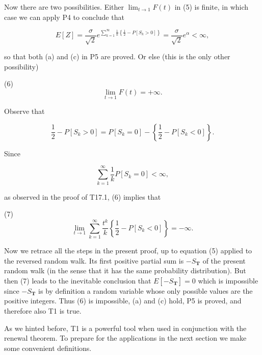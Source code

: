 Now there are two possibilities. Either $\lim_{t \to 1} F(t)$ in (5) is finite, in which case we can apply P4 to conclude that

$$E[Z] = \frac{\sigma}{\sqrt{2}} e^{\sum_{k=1}^{\infty} \frac{1}{k} \left\{ \frac{1}{2} - P[S_k > 0] \right\}} = \frac{\sigma}{\sqrt{2}} e^\alpha < \infty,$$

so that both (a) and (c) in P5 are proved. Or else (this is the only other possibility)

(6) $$\lim_{t \to 1} F(t) = +\infty.$$

Observe that

$$\frac{1}{2} - P[S_k > 0] = P[S_k = 0] - \left\{ \frac{1}{2} - P[S_k < 0] \right\}.$$

Since

$$\sum_{k=1}^{\infty} \frac{1}{k} P[S_k = 0] < \infty,$$

as observed in the proof of T17.1, (6) implies that

(7) $$\lim_{t \to 1} \sum_{k=1}^{\infty} \frac{t^k}{k} \left\{ \frac{1}{2} - P[S_k < 0] \right\} = -\infty.$$

Now we retrace all the steps in the present proof, up to equation (5) applied to the reversed random walk. Its first positive partial sum is $-S_{\mathbf{T}}$ of the present random walk (in the sense that it has the same probability distribution). But then (7) leads to the inevitable conclusion that $E[-S_{\mathbf{T}}] = 0$ which is impossible since $-S_{\mathbf{T}}$ is by definition a random variable whose only possible values are the positive integers. Thus (6) is impossible, (a) and (c) hold, P5 is proved, and therefore also T1 is true.

As we hinted before, T1 is a powerful tool when used in conjunction with the renewal theorem. To prepare for the applications in the next section we make some convenient definitions.